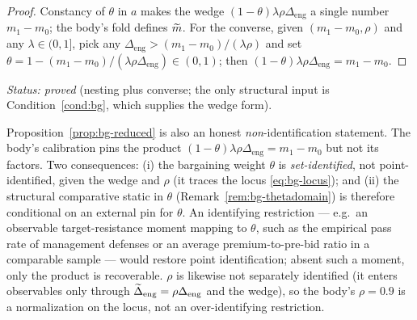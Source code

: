 \begin{proof}
Constancy of $\theta$ in $a$ makes the wedge
$(1-\theta)\lambda\rho\Delta_{\mathrm{eng}}$ a single number $m_{1}-m_{0}$; the
body's fold defines $\widetilde{m}$. For the converse, given $(m_{1}-m_{0},\rho)$ and any
$\lambda\in(0,1]$, pick any $\Delta_{\mathrm{eng}}>(m_{1}-m_{0})/(\lambda\rho)$
and set $\theta=1-(m_{1}-m_{0})/(\lambda\rho\Delta_{\mathrm{eng}})\in(0,1)$; then
$(1-\theta)\lambda\rho\Delta_{\mathrm{eng}}=m_{1}-m_{0}$.
\end{proof}

\noindent\emph{Status: proved} (nesting plus converse; the only structural input
is Condition~\ref{cond:bg}, which supplies the wedge form).

\begin{remark}
\label{rem:bg-ident}
Proposition~\ref{prop:bg-reduced} is also an honest \emph{non}-identification
statement. The body's calibration pins the product
$(1-\theta)\lambda\rho\Delta_{\mathrm{eng}}=m_{1}-m_{0}$ but not its factors. Two
consequences: (i) the bargaining weight $\theta$ is \emph{set-identified}, not
point-identified, given the wedge and $\rho$ (it traces the locus
\eqref{eq:bg-locus}); and (ii) the structural comparative static in $\theta$
(Remark~\ref{rem:bg-thetadomain}) is therefore conditional on an external pin for
$\theta$. An identifying restriction --- e.g.\ an observable target-resistance
moment mapping to $\theta$, such as the empirical pass rate of management
defenses or an average premium-to-pre-bid ratio in a comparable sample --- would
restore point identification; absent such a moment, only the product is
recoverable. $\rho$ is likewise not separately identified (it enters observables
only through $\widetilde{\Delta}_{\mathrm{eng}}=\rho\Delta_{\mathrm{eng}}$ and the wedge), so
the body's $\rho=0.9$ is a normalization on the locus, not an over-identifying
restriction.
\end{remark}

